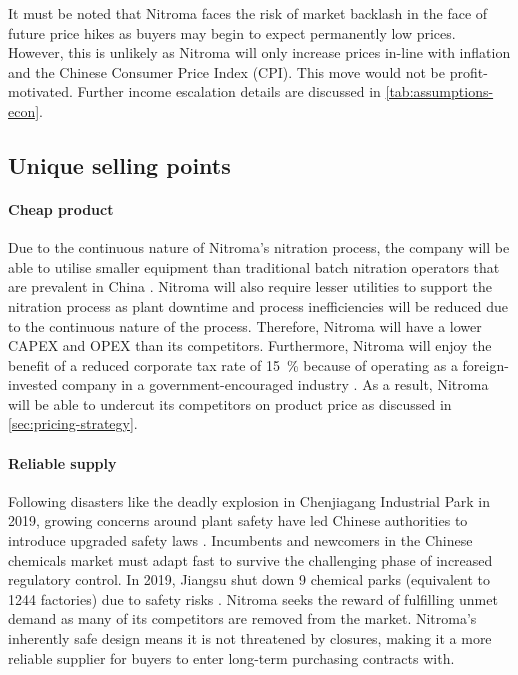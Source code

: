 It must be noted that Nitroma faces the risk of market backlash in the face of future price hikes as buyers may begin to expect permanently low prices. However, this is unlikely as Nitroma will only increase prices in-line with inflation and the Chinese Consumer Price Index (CPI). This move would not be profit-motivated. Further income escalation details are discussed in \ref{tab:assumptions-econ}.

\subsection{Unique selling points}
\label{sec:USP}
\paragraph{Cheap product}
Due to the continuous nature of Nitroma’s nitration process, the company will be able to utilise smaller equipment than traditional batch nitration operators that are prevalent in China \cite{lee_mordernizing_2015}. Nitroma will also require lesser utilities to support the nitration process as plant downtime and process inefficiencies will be reduced due to the continuous nature of the process. Therefore, Nitroma will have a lower CAPEX and OPEX than its competitors. Furthermore, Nitroma will enjoy the benefit of a reduced corporate tax rate of \SI{15}{\percent} because of operating as a foreign-invested company in a government-encouraged industry \cite{ministry_of_commerce_china_catalouge_2020}. As a result, Nitroma will be able to undercut its competitors on product price as discussed in \cref{sec:pricing-strategy}.

\paragraph{Reliable supply}
Following disasters like the deadly explosion in Chenjiagang Industrial Park in 2019, growing concerns around plant safety have led Chinese authorities to introduce upgraded safety laws \cite{naidu_china_2019}. Incumbents and newcomers in the Chinese chemicals market must adapt fast to survive the challenging phase of increased regulatory control. In 2019, Jiangsu shut down 9 chemical parks (equivalent to 1244 factories) due to safety risks \cite{kielburger_chinese_2019}. Nitroma seeks the reward of fulfilling unmet demand as many of its competitors are removed from the market. Nitroma’s inherently safe design means it is not threatened by closures, making it a more reliable supplier for buyers to enter long-term purchasing contracts with.

